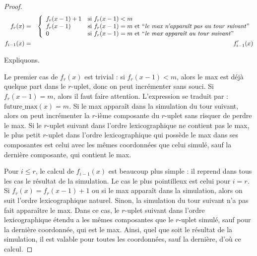 \begin{proof}
			\begin{eqnarray}
				f_{r}(x) & = & \casedist{
									f_{r}(x-1) + 1 & \text{si $f_{r}(x-1) < m$} \\
									f_{r}(x-1) & \text{si $f_{r}(x-1) = m$ et \textquoted{\emph{le max n'apparaît pas au tour suivant}}}\\
									0 & \text{si $f_{r}(x-1) = m$ et \textquoted{\emph{le max apparaît au tour suivant}}}
									}\\
				f_{i-1}(x) & = & f'_{i-1}(x)
			\end{eqnarray}
			
			Expliquons. 
			
			Le premier cas de $f_{r}(x)$ est trivial : si $f_{r}(x-1)<m$, alors le max est déjà quelque part dans le $r$-uplet, donc on peut incrémenter sans souci. Si $f_{r}(x-1) = m$, alors il faut faire attention. L'expression  se traduit par : $\text{future\_max}(x) = m$. Si le max apparaît dans la simulation du tour suivant, alors on peut incrémenter la $r$-ième composante du $r$-uplet sans risquer de perdre le max. Si le $r$-uplet suivant dans l'ordre lexicographique ne contient pas le max, le plus petit $r$-uplet dans l'ordre lexicographique qui possède le max dans ses composantes est celui avec les mêmes coordonnées que celui simulé, sauf la dernière composante, qui contient le max.
			
			Pour $i\leqslant r$, le calcul de $f_{i-1}(x)$ est beaucoup plus simple : il reprend dans tous les cas le résultat de la simulation. Le cas le plus pointilleux est celui pour $i=r$. Si $f_{r}(x) = f_{r}(x-1) + 1$ ou si le max apparaît dans la simulation, alors on suit l'ordre lexicographique naturel. Sinon, la simulation du tour suivant n'a pas fait apparaître le max. Dans ce cas, le $r$-uplet suivant dans l'ordre lexicographique étendu a les mêmes composantes que le $r$-uplet simulé, sauf pour la dernière coordonnée, qui est le max. Ainsi, quel que soit le résultat de la simulation, il est valable pour toutes les coordonnées, sauf la dernière, d'où ce calcul.
			

\end{proof}
